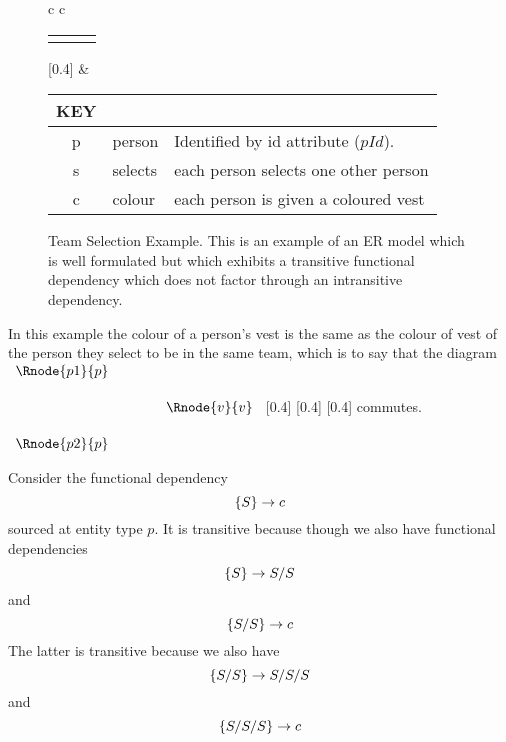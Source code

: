 \begin{figure} [h]
\begin{center}
\begin{tabular}{c c}
\begin{tabular}{c p{1.5cm} c}
   \Rnode{p}{p} & & \Rnode{v}{v}
\end{tabular}
[0.4]
\idcomp
& \footnotesize
\begin{tabular}{c p{1.5cm} p{4cm}}
KEY && \\
\hline
p & person & Identified by id attribute ($pId$). \\
s & selects & each person selects one other person \\
c & colour & each person is given a coloured vest 
\end{tabular} 
\end{tabular}
\end{center}
\caption{Team Selection Example. This is an example of an ER model 
which is well formulated but which exhibits a transitive functional dependency which does not factor through an intransitive dependency.
}
\label{teamselectionexample}
\end{figure}

In this example the colour of a person's vest is the same as the 
colour of vest of the person they select to be in the same team, which is to say that  the diagram
$
\begin{array}{c p{0.75cm} c}
   \Rnode{p1}{p}  & &                  \\[0.5cm]
	                 & &    \Rnode{v}{v} \\[0.5cm]
   \Rnode{p2}{p}  & &
			
\end{array}
$
[0.4]
[0.4]
[0.4]
commutes. 


Consider the functional dependency
\begin{equation*}
\left\{S\right\} \rightarrow c
\end{equation*}
sourced at entity type $p$. It is transitive
because though we also have functional dependencies
\begin{equation*}
\left\{S\right\} \rightarrow S/S
\end{equation*}
and
\begin{equation*}
\left\{S/S\right\} \rightarrow c
\end{equation*}
The latter is transitive because we also have
\begin{equation*}
\left\{S/S\right\} \rightarrow S/S/S
\end{equation*}
and
\begin{equation*}
\left\{S/S/S\right\} \rightarrow c 
\end{equation*} 

